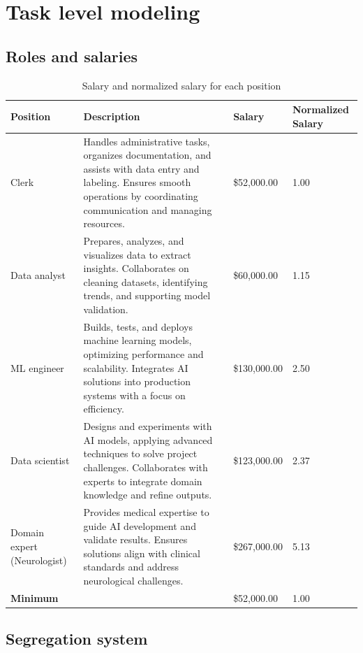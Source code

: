 \section{Task level modeling}

\subsection{Roles and salaries}

\begin{table}[H]
\centering
\begin{tabularx}{\textwidth}{|p{2.3cm}|X|l|m{2.2cm}|}
\hline
\textbf{Position} & \textbf{Description} & \textbf{Salary} & \textbf{Normalized Salary} \\
\hline
Clerk & Handles administrative tasks, organizes documentation, and assists with data entry and labeling.
Ensures smooth operations by coordinating communication and managing resources. & \$52,000.00 & 1.00 \\
\hline
Data analyst & Prepares, analyzes, and visualizes data to extract insights. 
Collaborates on cleaning datasets, identifying trends, and supporting model validation. & \$60,000.00 & 1.15 \\
\hline
ML engineer & Builds, tests, and deploys machine learning models, optimizing performance and scalability. 
Integrates AI solutions into production systems with a focus on efficiency. & \$130,000.00 & 2.50 \\
\hline
Data scientist & Designs and experiments with AI models, applying advanced techniques to solve project challenges. 
Collaborates with experts to integrate domain knowledge and refine outputs. & \$123,000.00 & 2.37 \\
\hline
Domain expert (Neurologist) & Provides medical expertise to guide AI development and validate results. 
Ensures solutions align with clinical standards and address neurological challenges. & \$267,000.00 & 5.13 \\
\hline
\multicolumn{2}{|l|}{\textbf{Minimum}} & \$52,000.00 & 1.00 \\
\hline
\end{tabularx}
\caption{Salary and normalized salary for each position}
\label{table:salary}
\end{table}

\subsection{Segregation system}

